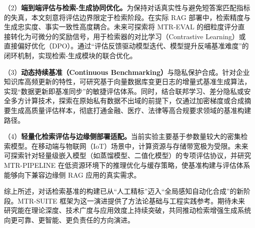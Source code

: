 （2）\textbf{端到端评估与检索-生成协同优化。}为保持对话真实性与避免短答案匹配指标的失真，本文刻意将评估边界限定于检索阶段。在实际 RAG 部署中，检索精度与生成忠实度、事实一致性高度耦合。未来可探索将 MTR-EVAL 的细粒度评分直接转化为可微分的奖励信号，用于检索器的对比学习（Contrastive Learning）或直接偏好优化（DPO）。通过“评估反馈驱动模型迭代、模型提升反哺基准难度”的闭环机制，实现检索-生成模块的联合优化。
    
（3）\textbf{动态持续基准（Continuous Benchmarking）}与隐私保护合成。针对企业知识库高频更新的特性，可研究基于向量数据库变更日志的增量式基准生成算法，实现“数据更新即基准同步”的敏捷评估体系。同时，结合联邦学习、差分隐私或安全多方计算技术，探索在原始私有数据不出域的前提下，仅通过加密梯度或合成摘要生成高质量评估样本，彻底打通金融、医疗、法律等高合规要求领域的基准构建路径。
    
（4）\textbf{轻量化检索评估与边缘侧部署适配。}当前实验主要基于参数量较大的密集检索模型。在移动端与物联网（IoT）场景中，计算资源与存储带宽极为受限。未来可探索针对轻量级嵌入模型（如蒸馏模型、二值化模型）的专项评估协议，并研究 MTR-PIPELINE 在低资源环境下的推理优化与缓存策略，使基准构建与评估体系能够向下兼容边缘侧 RAG 应用的真实需求。


综上所述，对话检索基准的构建已从“人工精标”迈入“全局感知自动化合成”的新阶段。MTR-SUITE 框架为这一演进提供了方法论基础与工程实践参考。期待未来研究能在理论深度、技术广度与应用效度上持续突破，共同推动检索增强生成系统向更可靠、更智能、更负责任的方向演进。